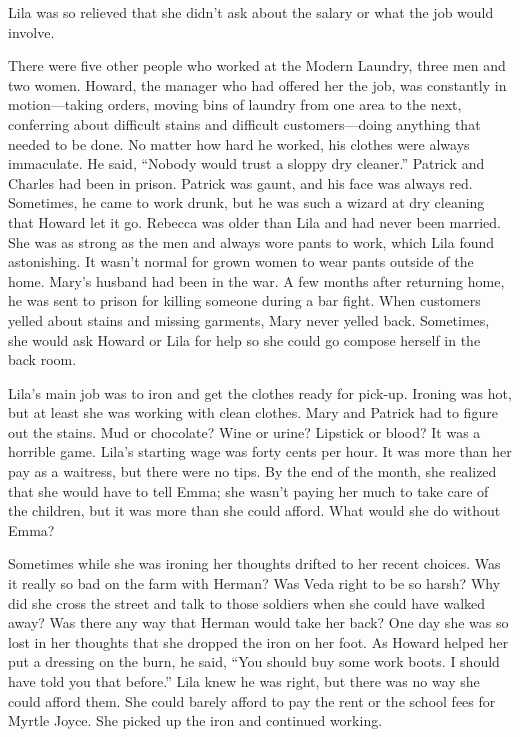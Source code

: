 \documentclass[
  letterpaper,
]{book}
\begin{document}
Lila was so relieved that she didn't ask about the salary or what the
job would involve.

There were five other people who worked at the Modern Laundry, three men
and two women. Howard, the manager who had offered her the job, was
constantly in motion---taking orders, moving bins of laundry from one
area to the next, conferring about difficult stains and difficult
customers---doing anything that needed to be done. No matter how hard he
worked, his clothes were always immaculate. He said, ``Nobody would
trust a sloppy dry cleaner.'' Patrick and Charles had been in prison.
Patrick was gaunt, and his face was always red. Sometimes, he came to
work drunk, but he was such a wizard at dry cleaning that Howard let it
go. Rebecca was older than Lila and had never been married. She was as
strong as the men and always wore pants to work, which Lila found
astonishing. It wasn't normal for grown women to wear pants outside of
the home. Mary's husband had been in the war. A few months after
returning home, he was sent to prison for killing someone during a bar
fight. When customers yelled about stains and missing garments, Mary
never yelled back. Sometimes, she would ask Howard or Lila for help so
she could go compose herself in the back room.

Lila's main job was to iron and get the clothes ready for pick-up.
Ironing was hot, but at least she was working with clean clothes. Mary
and Patrick had to figure out the stains. Mud or chocolate? Wine or
urine? Lipstick or blood? It was a horrible game. Lila's starting wage
was forty cents per hour. It was more than her pay as a waitress, but
there were no tips. By the end of the month, she realized that she would
have to tell Emma; she wasn't paying her much to take care of the
children, but it was more than she could afford. What would she do
without Emma?

Sometimes while she was ironing her thoughts drifted to her recent
choices. Was it really so bad on the farm with Herman? Was Veda right to
be so harsh? Why did she cross the street and talk to those soldiers
when she could have walked away? Was there any way that Herman would
take her back? One day she was so lost in her thoughts that she dropped
the iron on her foot. As Howard helped her put a dressing on the burn,
he said, ``You should buy some work boots. I should have told you that
before.'' Lila knew he was right, but there was no way she could afford
them. She could barely afford to pay the rent or the school fees for
Myrtle Joyce. She picked up the iron and continued working.
\end{document}
